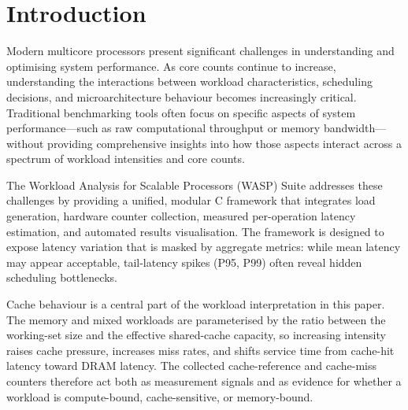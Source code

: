 \documentclass[conference]{IEEEtran}
\begin{document}
\section{Introduction}
\label{sec:intro}

Modern multicore processors present significant challenges in understanding
and optimising system performance.  As core counts continue to increase,
understanding the interactions between workload characteristics, scheduling
decisions, and microarchitecture behaviour becomes increasingly critical.
Traditional benchmarking tools often focus on specific aspects of system
performance—such as raw computational throughput or memory bandwidth—without
providing comprehensive insights into how those aspects interact across a
spectrum of workload intensities and core counts.

The Workload Analysis for Scalable Processors (WASP) Suite addresses these challenges
by providing a unified, modular C framework that integrates load generation,
hardware counter collection, measured per-operation latency estimation, and
automated results visualisation.  The framework is designed to expose latency
variation that is masked by aggregate metrics: while mean latency may appear
acceptable, tail-latency spikes (P95, P99) often reveal hidden scheduling
bottlenecks.

Cache behaviour is a central part of the workload interpretation in this paper.
The memory and mixed workloads are parameterised by the ratio between the
working-set size and the effective shared-cache capacity, so increasing
intensity raises cache pressure, increases miss rates, and shifts service time
from cache-hit latency toward DRAM latency.  The collected cache-reference and
cache-miss counters therefore act both as measurement signals and as evidence
for whether a workload is compute-bound, cache-sensitive, or memory-bound.
\end{document}
